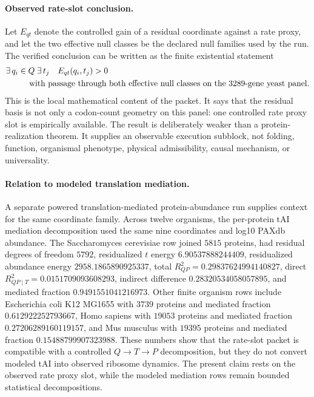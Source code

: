 \paragraph{Observed rate-slot conclusion.}
Let $E_{qt}$ denote the controlled gain of a residual coordinate against a rate proxy, and let the two effective null classes be the declared null families used by the run. The verified conclusion can be written as the finite existential statement
$$
\begin{aligned}
&\exists\,q_i\in Q\;\exists\,t_j\quad
E_{qt}(q_i,t_j)>0\\
&\hspace{1.0cm}\text{with passage through both effective null classes on the }3289\text{-gene yeast panel.}
\end{aligned}
$$
This is the local mathematical content of the packet. It says that the residual basis is not only a codon-count geometry on this panel: one controlled rate proxy slot is empirically available. The result is deliberately weaker than a protein-realization theorem. It supplies an observable execution subblock, not folding, function, organismal phenotype, physical admissibility, causal mechanism, or universality.

\paragraph{Relation to modeled translation mediation.}
A separate powered translation-mediated protein-abundance run supplies context for the same coordinate family. Across twelve organisms, the per-protein tAI mediation decomposition used the same nine coordinates and log10 PAXdb abundance. The Saccharomyces cerevisiae row joined $5815$ proteins, had residual degrees of freedom $5792$, residualized $t$ energy $6.90537888244409$, residualized abundance energy $2958.1865890925337$, total $R^2_{QP}=0.29837624994140827$, direct $R^2_{QP\mid T}=0.0151709093608293$, indirect difference $0.28320534058057895$, and mediated fraction $0.9491551041216973$. Other finite organism rows include Escherichia coli K12 MG1655 with $3739$ proteins and mediated fraction $0.612922252793667$, Homo sapiens with $19053$ proteins and mediated fraction $0.27206289160119157$, and Mus musculus with $19395$ proteins and mediated fraction $0.15488799907323988$. These numbers show that the rate-slot packet is compatible with a controlled $Q\to T\to P$ decomposition, but they do not convert modeled tAI into observed ribosome dynamics. The present claim rests on the observed rate proxy slot, while the modeled mediation rows remain bounded statistical decompositions.

